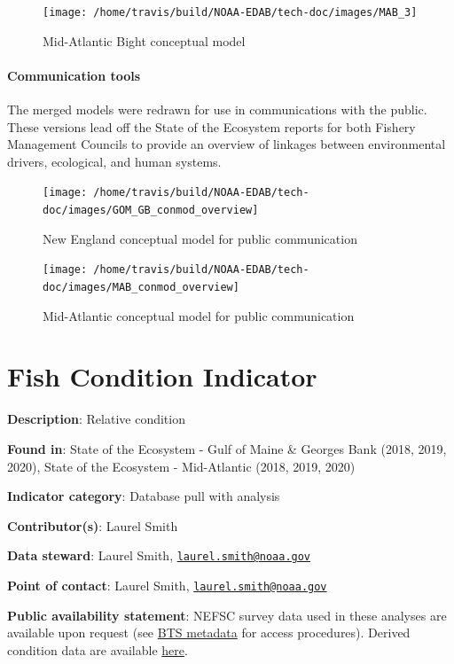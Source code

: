 \documentclass[
]{book}
\begin{document}
\begin{figure}
\texttt{[image: /home/travis/build/NOAA-EDAB/tech-doc/images/MAB\_3]} \caption{Mid-Atlantic Bight conceptual model}\label{fig:diaMAB}
\end{figure}

\hypertarget{communication-tools}{%
\subsubsection{Communication tools}\label{communication-tools}}

The merged models were redrawn for use in communications with the public. These versions lead off the State of the Ecosystem reports for both Fishery Management Councils to provide an overview of linkages between environmental drivers, ecological, and human systems.

\begin{figure}
\texttt{[image: /home/travis/build/NOAA-EDAB/tech-doc/images/GOM\_GB\_conmod\_overview]} \caption{New England conceptual model for public communication}\label{fig:prettyNE}
\end{figure}

\begin{figure}
\texttt{[image: /home/travis/build/NOAA-EDAB/tech-doc/images/MAB\_conmod\_overview]} \caption{Mid-Atlantic conceptual model for public communication}\label{fig:prettyMA}
\end{figure}

\hypertarget{fish-condition-indicator}{%
\chapter{Fish Condition Indicator}\label{fish-condition-indicator}}

\textbf{Description}: Relative condition

\textbf{Found in}: State of the Ecosystem - Gulf of Maine \& Georges Bank (2018, 2019, 2020), State of the Ecosystem - Mid-Atlantic (2018, 2019, 2020)

\textbf{Indicator category}: Database pull with analysis

\textbf{Contributor(s)}: Laurel Smith

\textbf{Data steward}: Laurel Smith, \href{mailto:laurel.smith@noaa.gov}{\nolinkurl{laurel.smith@noaa.gov}}

\textbf{Point of contact}: Laurel Smith, \href{mailto:laurel.smith@noaa.gov}{\nolinkurl{laurel.smith@noaa.gov}}

\textbf{Public availability statement}: NEFSC survey data used in these analyses are available upon request (see \href{https://inport.nmfs.noaa.gov/inport/item/22560}{BTS metadata} for access procedures). Derived condition data are available \href{https://comet.nefsc.noaa.gov/erddap/tabledap/gf_condition_soe_v1.html}{here}.
\end{document}
